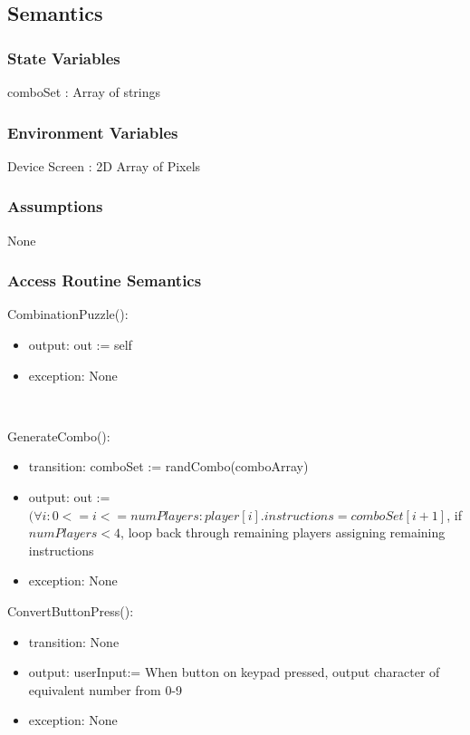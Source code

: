 \documentclass[12pt, titlepage]{article}
\begin{document}
\subsection{Semantics}

\subsubsection{State Variables}

comboSet : Array of strings

\subsubsection{Environment Variables}

Device Screen : 2D Array of Pixels


\subsubsection{Assumptions}

None

\subsubsection{Access Routine Semantics}

\noindent CombinationPuzzle():
\begin{itemize}
\item output: out := self
\item exception: None
\end{itemize}\

\noindent GenerateCombo():
\begin{itemize}
\item transition: comboSet := randCombo(comboArray)
\item output: out := $ (\forall i : 0<=i<=numPlayers : player[i].instructions = comboSet[i+1]$, if $numPlayers<4$, loop back through remaining players assigning remaining instructions
\item exception: None
\end{itemize}

\noindent ConvertButtonPress():
\begin{itemize}
\item transition: None
\item output: userInput:= When button on keypad pressed, output character of equivalent number from 0-9
\item exception: None
\end{itemize}
\end{document}
